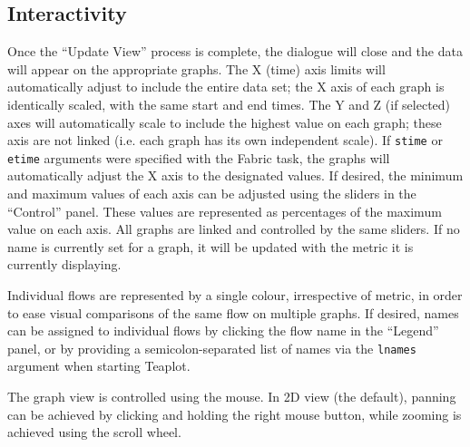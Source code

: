 \documentclass[a4paper,twocolumn,english,11pt, a4paper, conference]{IEEEtran}
\begin{document}
\subsection{Interactivity}


Once the ``Update View'' process is complete, the dialogue will close and the data will appear on the appropriate graphs. The X (time) axis limits will automatically adjust to include the entire data set; the X axis of each graph is identically scaled, with the same start and end times. The Y and Z (if selected) axes will automatically scale to include the highest value on each graph; these axis are not linked (i.e. each graph has its own independent scale). If \texttt{stime} or \texttt{etime} arguments were specified with the Fabric task, the graphs will automatically adjust the X axis to the designated values. If desired, the minimum and maximum values of each axis can be adjusted using the sliders in the ``Control'' panel. These values are represented as percentages of the maximum value on each axis. All graphs are linked and controlled by the same sliders. If no name is currently set for a graph, it will be updated with the metric it is currently displaying.

Individual flows are represented by a single colour, irrespective of metric, in order to ease visual comparisons of the same flow on multiple graphs. If desired, names can be assigned to individual flows by clicking the flow name in the ``Legend'' panel, or by providing a semicolon-separated list of names via the \texttt{lnames} argument when starting Teaplot.

The graph view is controlled using the mouse. In 2D view (the default), panning can be achieved by clicking and holding the right mouse button, while zooming is achieved using the scroll wheel.
\end{document}
